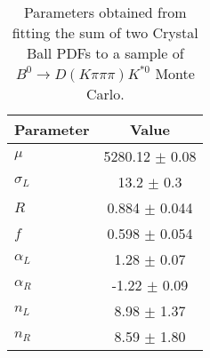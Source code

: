 \begin{table}[h]
  \centering
  \begin{tabular}{lc}
      \toprule
      Parameter & Value \\
      \midrule
      $\mu$ & 5280.12 $\pm$ 0.08 \\
      $\sigma_L$ & 13.2 $\pm$ 0.3 \\
      $R$ & 0.884 $\pm$ 0.044 \\
      $f$ & 0.598 $\pm$ 0.054 \\
      $\alpha_L$ & 1.28 $\pm$ 0.07 \\
      $\alpha_R$ & -1.22 $\pm$ 0.09 \\
      $n_L$ & 8.98 $\pm$ 1.37 \\
      $n_R$ & 8.59 $\pm$ 1.80 \\
  \bottomrule
  \end{tabular}
  \caption{Parameters obtained from fitting the sum of two Crystal Ball PDFs to a sample of $B^0 \to D(K\pi\pi\pi)K^{*0}$ Monte Carlo.}
\label{tab:signal_Kpipipi_MC_params}
\end{table}
